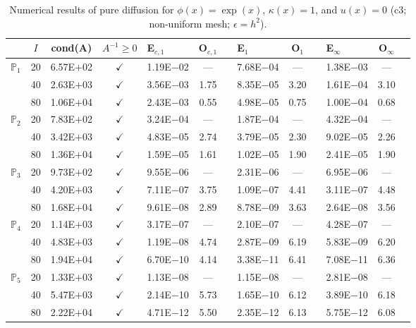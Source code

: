 \begin{table}[H]
\centering
\caption{Numerical results of pure diffusion for $\phi(x)=\exp(x)$, $\kappa(x)=1$, and $u(x)=0$ (c3; non-uniform mesh; $\epsilon=h^2$).}
\begin{tabular}{@{}l c c c l c c l c c l c c@{}}
\toprule
 & $I$ & cond(A) & $A^{-1}\geq 0$ &  E$_{c,1}$ & O$_{c,1}$ && E$_1$ & O$_1$ && E$_{\infty}$ & O$_{\infty}$\\
\midrule
\multirow{3}{*}{$\mathbb{P}_{1}$}
 & 20 & 6.57E$+$02 & $\checkmark$ & 1.19E$-$02 & --- && 7.68E$-$04 & --- && 1.38E$-$03 & ---\\
 & 40 & 2.63E$+$03 & $\checkmark$ & 3.56E$-$03 & 1.75 && 8.35E$-$05 & 3.20 && 1.61E$-$04 & 3.10\\
 & 80 & 1.06E$+$04 & $\checkmark$ & 2.43E$-$03 & 0.55 && 4.98E$-$05 & 0.75 && 1.00E$-$04 & 0.68\\
\midrule
\multirow{3}{*}{$\mathbb{P}_{2}$}
 & 20 & 7.83E$+$02 & $\checkmark$ & 3.24E$-$04 & --- && 1.87E$-$04 & --- && 4.32E$-$04 & ---\\
 & 40 & 3.42E$+$03 & $\checkmark$ & 4.83E$-$05 & 2.74 && 3.79E$-$05 & 2.30 && 9.02E$-$05 & 2.26\\
 & 80 & 1.36E$+$04 & $\checkmark$ & 1.59E$-$05 & 1.61 && 1.02E$-$05 & 1.90 && 2.41E$-$05 & 1.90\\
\midrule
\multirow{3}{*}{$\mathbb{P}_{3}$}
 & 20 & 9.73E$+$02 & $\checkmark$ & 9.55E$-$06 & --- && 2.31E$-$06 & --- && 6.95E$-$06 & ---\\
 & 40 & 4.20E$+$03 & $\checkmark$ & 7.11E$-$07 & 3.75 && 1.09E$-$07 & 4.41 && 3.11E$-$07 & 4.48\\
 & 80 & 1.68E$+$04 & $\checkmark$ & 9.61E$-$08 & 2.89 && 8.78E$-$09 & 3.63 && 2.64E$-$08 & 3.56\\
\midrule
\multirow{3}{*}{$\mathbb{P}_{4}$}
 & 20 & 1.14E$+$03 & $\checkmark$ & 3.17E$-$07 & --- && 2.10E$-$07 & --- && 4.28E$-$07 & ---\\
 & 40 & 4.83E$+$03 & $\checkmark$ & 1.19E$-$08 & 4.74 && 2.87E$-$09 & 6.19 && 5.83E$-$09 & 6.20\\
 & 80 & 1.94E$+$04 & $\checkmark$ & 6.70E$-$10 & 4.14 && 3.38E$-$11 & 6.41 && 7.08E$-$11 & 6.36\\
\midrule
\multirow{3}{*}{$\mathbb{P}_{5}$}
 & 20 & 1.33E$+$03 & $\checkmark$ & 1.13E$-$08 & --- && 1.15E$-$08 & --- && 2.81E$-$08 & ---\\
 & 40 & 5.47E$+$03 & $\checkmark$ & 2.14E$-$10 & 5.73 && 1.65E$-$10 & 6.12 && 3.89E$-$10 & 6.18\\
 & 80 & 2.22E$+$04 & $\checkmark$ & 4.71E$-$12 & 5.50 && 2.35E$-$12 & 6.13 && 5.75E$-$12 & 6.08\\
\bottomrule
\end{tabular}
\end{table}
